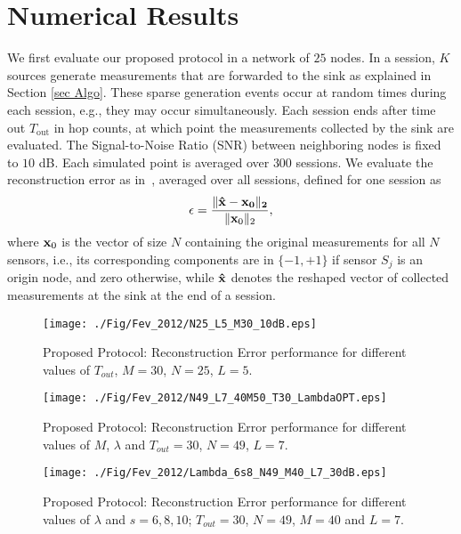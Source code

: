 \documentclass[letterpaper,conference]{IEEEtran}
\begin{document}
\section{Numerical Results}

We first evaluate our proposed protocol in a network of $25$ nodes. In a session, $K$ sources generate measurements that are forwarded to the sink as explained in Section \ref{sec Algo}. These sparse generation events occur at random times during each session, e.g., they may occur simultaneously. Each session ends after time out $T_{\mathrm{out}}$ in hop counts, at which point the measurements collected by the sink are evaluated. The Signal-to-Noise Ratio (SNR) between neighboring nodes is fixed to $10$ dB. Each simulated point is averaged over $300$ sessions.
We evaluate the reconstruction error as in~\cite{Que09feb}\cite{Wan10oct}, averaged over all sessions, defined for one session as
\begin{equation}\label{eq NMSE}
    \epsilon=\frac{\|\bf \hat{x}-\mbox{\bf x}_0\|_2}{\|\mbox{\bf x}_0\|_2},
\end{equation}
where $\mbox{\bf x}_0$ is the vector of size $N$ containing the original measurements for all $N$ sensors, i.e., its corresponding components are in $\{-1,+1\}$ if sensor $S_j$ is an origin node, and zero otherwise, while $\bf \hat{x}$ denotes the reshaped vector of collected measurements at the sink at the end of a session.

\begin{figure}[h]
\begin{center}
   \texttt{[image: ./Fig/Fev\_2012/N25\_L5\_M30\_10dB.eps]} \vspace{-0.6cm}
\caption{Proposed Protocol: Reconstruction Error performance for different values of $T_{out}$, $M=30$, $N=25$, $L=5$.}
\label{fig:REN25}
\end{center}
\end{figure}


\begin{figure}[h]
\begin{center}
   \texttt{[image: ./Fig/Fev\_2012/N49\_L7\_40M50\_T30\_LambdaOPT.eps]} \vspace{-0.6cm}
\caption{Proposed Protocol: Reconstruction Error performance for different values of $M$, $\lambda$ and $T_{out}=30$, $N=49$, $L=7$.}
\label{fig:REN49}
\end{center}
\end{figure}


\begin{figure}[h]
\begin{center}
   \texttt{[image: ./Fig/Fev\_2012/Lambda\_6s8\_N49\_M40\_L7\_30dB.eps]} \vspace{-0.6cm}
\caption{Proposed Protocol: Reconstruction Error performance for different values of $\lambda$ and $s=6, 8, 10$; $T_{out}=30$, $N=49$, $M=40$ and $L=7$.}
\label{fig:REN49Lambda}
\end{center}
\end{figure}
\end{document}
